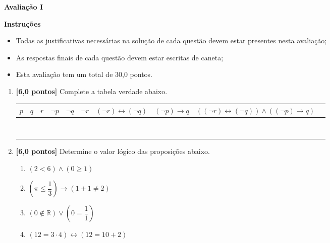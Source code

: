 \documentclass[12pt,a4paper]{article}
\begin{document}
\begin{center}
 \textbf{Avaliação I}
\end{center}

\textbf{Instruções}
\begin{itemize}
 \item Todas as justificativas necessárias na solução de cada questão devem estar presentes nesta avaliação;
 \item As respostas finais de cada questão devem estar escritas de caneta;
 \item Esta avaliação tem um total de 30,0 pontos.
\end{itemize}

\begin{enumerate}
  \item \textbf{[6,0 pontos]} Complete a tabela verdade abaixo.
  
  \begin{center}
    \begin{tabular}{|c|c|c|c|c|c|c|c|c|c|}
      \hline
      $p$ & $q$ & $r$ & $\lnot p$ & $\lnot q$ & $\lnot r$ &  $(\lnot r) \leftrightarrow (\lnot q)$ & $(\lnot p)\rightarrow q$ & $((\lnot r) \leftrightarrow (\lnot q))\wedge ((\lnot p)\rightarrow q)$\\ \hline
       & & & & & & & & \\ \hline
       & & & & & & & &  \\ \hline
       & & & & & & & &  \\ \hline
       & & & & & & & &  \\ \hline
       & & & & & & & &  \\ \hline
       & & & & & & & &  \\ \hline
       & & & & & & & &  \\ \hline
       & & & & & & & &  \\ \hline
    \end{tabular}
  \end{center}

  \item \textbf{[6,0 pontos]} Determine o valor lógico das proposições abaixo.

    \begin{enumerate}
      \item $(2 < 6) \wedge (0 \geq 1)$
      \item $\left(\pi \leq \dfrac{1}{3}\right)\to (1 + 1 \neq 2)$
      \item $\left(0 \not\in \mathbb{R}\right)\vee \left(0 = \dfrac{1}{1}\right)$
      \item $\left(12 = 3\cdot 4\right) \leftrightarrow \left(12 = 10 + 2\right)$
    \end{enumerate}
      

\end{enumerate}
\end{document}
